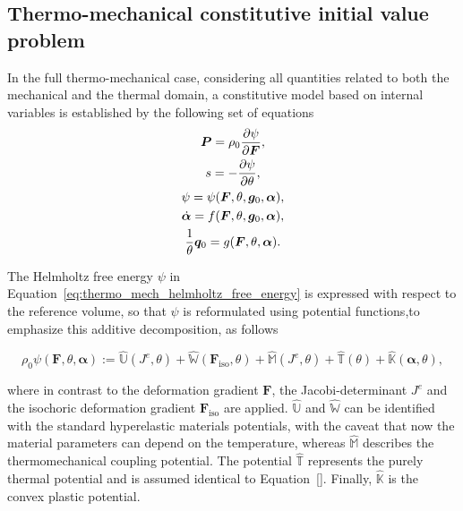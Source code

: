 \subsection{Thermo-mechanical constitutive initial value problem}

In the full thermo-mechanical case, considering all quantities related to both the mechanical and the thermal domain, a constitutive model based on internal variables is established by the following set of equations
    \begin{gather}
        \bm{P} = \rho_0 \frac{\partial \psi}{\partial \bm{F}},\\
        s = - \frac{\partial \psi}{\partial \theta},\\
        \psi = \psi(\bm{F},\theta, \bm g_0,\bm{\alpha}),\label{eq:thermo_mech_helmholtz_free_energy}\\
        \dot{\bm \alpha} = f(\bm{F}, \theta, \bm g_0,\bm \alpha),\\
        \frac{1}{\theta}\bm q_0 = g(\bm F, \theta, \bm \alpha).
    \end{gather}

The Helmholtz free energy \(\psi\) in Equation~\ref{eq:thermo_mech_helmholtz_free_energy} is expressed with respect to the reference volume, so that \(\psi\) is reformulated using potential functions,to emphasize this additive decomposition, as follows
  \begin{highlight}
    \begin{equation}
    \rho_{0} \psi\left(\bm{F}, \theta, \bm{\alpha}\right):=\hat{\mathbb{U}}\left(J^e,\theta\right)+\hat{\mathbb{W}}(\bm{F}_\text{iso},\theta)+\hat{\mathbb{M}}\left(J^e, \theta\right)+\hat{\mathbb{T}}(\theta)+\hat{\mathbb{K}}\left(\boldsymbol{\alpha}, \theta\right),
    \end{equation}
  \end{highlight}
  where in contrast to the deformation gradient \(\bm{F}\), the Jacobi-determinant \(J^{e}\) and the isochoric deformation gradient \(\bm{F}_\text{iso}\) are applied.
  \(\hat{\mathbb U}\) and \(\hat{\mathbb{W}}\) can be identified with the standard hyperelastic materials potentials, with the caveat that now the material parameters can depend on the temperature, whereas
  \(\hat{\mathbb M}\) describes the thermomechanical coupling potential.
  The potential \(\hat{\mathbb{T}}\) represents the purely thermal potential and is assumed identical to Equation~\eqref{}.
  Finally, \(\hat{\mathbb{K}}\) is the convex plastic potential.

